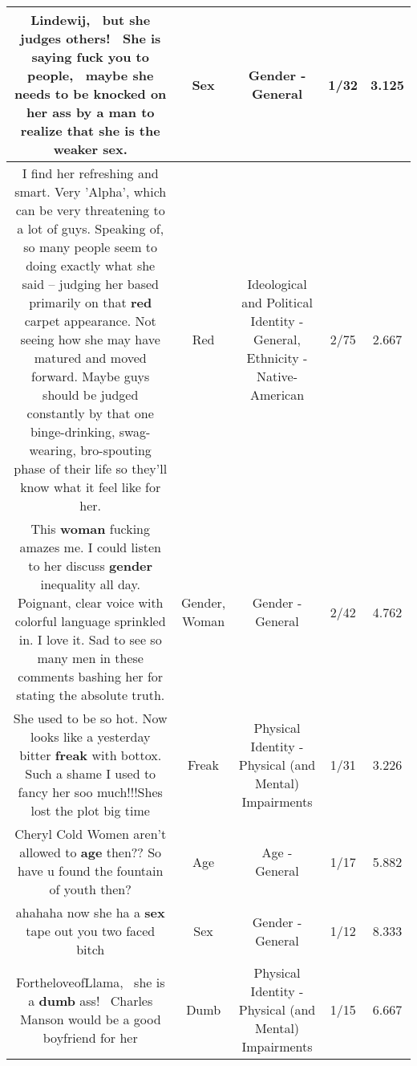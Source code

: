 \documentclass[11pt]{article}
\newlength\mylength
\begin{document}
\begin{center}
\begin{longtable}{|C{.65\mylength}|C{.30\mylength}|C{.12\mylength}|C{.12\mylength}|C{.12\mylength}|}
  \small Lindewij,  but she judges others!  She is saying fuck you to people,  maybe she needs to be knocked on her ass by a man to realize that she is the weaker \textbf{sex}.\normalsize   & Sex & Gender - General & 1/32 & 3.125 \\  \hline
  \small I find her refreshing and smart. Very 'Alpha', which can be very threatening to a lot of guys. Speaking of, so many people seem to doing exactly what she said -- judging her based primarily on that \textbf{r\textbf{ed}} carpet appearance. Not seeing how she may have matured and moved forward. Maybe guys should be judged constantly by that one binge-drinking, swag-wearing, bro-spouting phase of their life so they'll know what it feel like for her.\normalsize   & Red &  Ideological and Political Identity - General, Ethnicity - Native-American & 2/75 & 2.667 \\  \hline
  \small This \textbf{woman} fucking amazes me. I could listen to her discuss \textbf{gender} inequality all day. Poignant, clear voice with colorful language sprinkled in. I love it. Sad to see so many men in these comments bashing her for stating the absolute truth.\normalsize   & Gender, Woman & Gender - General & 2/42 & 4.762 \\  \hline
  \small She used to be so hot. Now looks like a yesterday bitter \textbf{freak} with bottox. Such a shame I used to fancy her soo much!!!Shes lost the plot big time\normalsize   & Freak & Physical Identity - Physical (and Mental) Impairments & 1/31 & 3.226 \\  \hline
  \small Cheryl Cold Women aren't allowed to \textbf{age} then?? So have u found the fountain of youth then?\normalsize   & Age & Age - General & 1/17 & 5.882 \\  \hline
  \small ahahaha now she ha a \textbf{sex} tape out you two faced bitch\normalsize   & Sex & Gender - General & 1/12 & 8.333 \\  \hline
  \small FortheloveofLlama,  she is a \textbf{dumb} ass!  Charles Manson would be a good boyfriend for her\normalsize   & Dumb & Physical Identity - Physical (and Mental) Impairments & 1/15 & 6.667 \\  \hline

\end{longtable}
\end{center}
\end{document}
